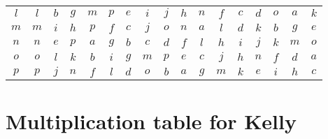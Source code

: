 \documentclass[12pt]{amsart}
\begin{document}
\begin{center}
\begin{tabular}{c|cccccccccccccccc}
	\(l\)  & \(l\)  & \(b\)  & \(g\)  & \(m\)  & \(p\)  & \(e\)  & \(i\)  & \(j\)  & \(h\)  & \(n\)  & \(f\)  & \(c\)  & \(d\)  & \(o\)  & \(a\)  & \(k\)  \\
	\(m\)  & \(m\)  & \(i\)  & \(h\)  & \(p\)  & \(f\)  & \(c\)  & \(j\)  & \(o\)  & \(n\)  & \(a\)  & \(l\)  & \(d\)  & \(k\)  & \(b\)  & \(g\)  & \(e\)  \\
	\(n\)  & \(n\)  & \(e\)  & \(p\)  & \(a\)  & \(g\)  & \(b\)  & \(c\)  & \(d\)  & \(f\)  & \(l\)  & \(h\)  & \(i\)  & \(j\)  & \(k\)  & \(m\)  & \(o\)  \\
	\(o\)  & \(o\)  & \(l\)  & \(k\)  & \(b\)  & \(i\)  & \(g\)  & \(m\)  & \(p\)  & \(e\)  & \(c\)  & \(j\)  & \(h\)  & \(n\)  & \(f\)  & \(d\)  & \(a\)  \\
	\(p\)  & \(p\)  & \(j\)  & \(n\)  & \(f\)  & \(l\)  & \(d\)  & \(o\)  & \(b\)  & \(a\)  & \(g\)  & \(m\)  & \(k\)  & \(e\)  & \(i\)  & \(h\)  & \(c\)  
\end{tabular}\end{center}\clearpage

\section*{Multiplication table for Kelly}
\end{document}

